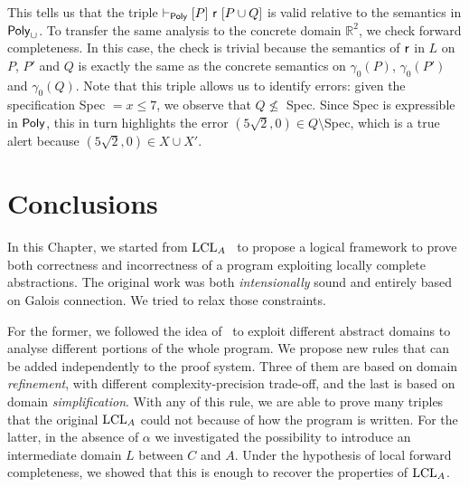 \begin{example}
	This tells us that the triple $\vdash_{\mathsf{Poly}}\nobreak[P]~\mathsf{r}~[P \cup Q]$ is valid relative to the semantics in $\mathsf{Poly}_{\cup}$. To transfer the same analysis to the concrete domain $\mathbb{R}^2$, we  check forward completeness. In this case, the check is trivial because the semantics of $\mathsf{r}$ in $L$ on $P$, $P'$ and $Q$ is exactly the same as the concrete semantics on $\gamma_0(P)$, $\gamma_0(P')$ and $\gamma_0(Q)$.
	Note that this triple allows us to identify errors: given the specification Spec $= x \le 7$, we observe that $Q \nleq $ Spec. Since Spec is expressible in $\mathsf{Poly}$, this in turn highlights the error $(5 \sqrt{2}, 0) \in Q \setminus $Spec, which is a true alert because $(5 \sqrt{2}, 0) \in X \cup X'$.
\end{example}

\section{Conclusions}
In this Chapter, we started from $\text{LCL}_A$~\cite{BGGR21} to propose a logical framework to prove both correctness and incorrectness of a program exploiting locally complete abstractions. The original work was both \emph{intensionally} sound and entirely based on Galois connection. We tried to relax those constraints.

For the former, we followed the idea of~\cite{BGGR23} to exploit different abstract domains to analyse different portions of the whole program. We propose new rules that can be added independently to the proof system. Three of them are based on domain \emph{refinement}, with different complexity-precision trade-off, and the last is based on domain \emph{simplification}. With any of this rule, we are able to prove many triples that the original $\text{LCL}_A$ could not because of how the program is written.
For the latter, in the absence of $\alpha$ we investigated the possibility to introduce an intermediate domain $L$ between $C$ and $A$. Under the hypothesis of local forward completeness, we showed that this is enough to recover the properties of $\text{LCL}_A$.


